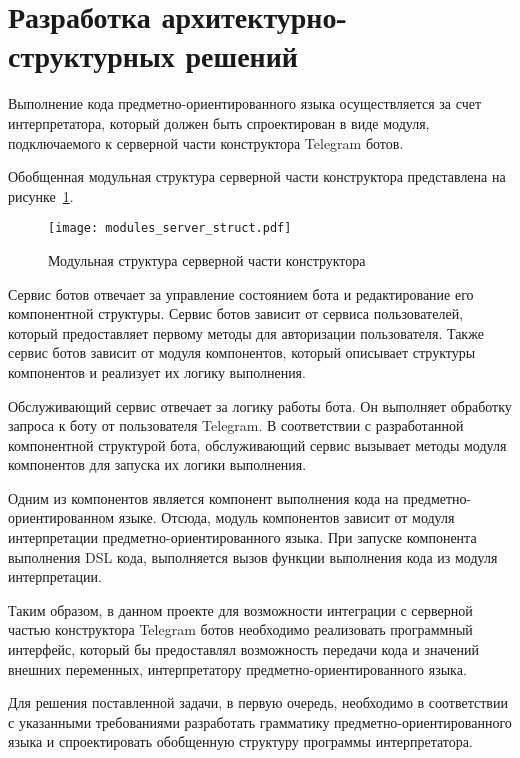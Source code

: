 \newpage

\section{Разработка архитектурно-структурных решений}

Выполнение кода предметно-ориентированного языка осуществляется за счет интерпретатора,
который должен быть спроектирован в виде модуля, подключаемого к серверной части конструктора Telegram ботов.

Обобщенная модульная структура серверной части конструктора представлена на рисунке~\ref{f:modules_server_struct}.

\begin{figure}[ht]
	\centering
	\vspace{\toppaddingoffigure}
	\texttt{[image: modules\_server\_struct.pdf]}
	\caption{Модульная структура серверной части конструктора}
	\label{f:modules_server_struct}
\end{figure}

Сервис ботов отвечает за управление состоянием бота и редактирование его компонентной структуры.
Сервис ботов зависит от сервиса пользователей, который предоставляет первому методы для авторизации пользователя.
Также сервис ботов зависит от модуля компонентов, который описывает структуры компонентов и реализует их логику выполнения.

Обслуживающий сервис отвечает за логику работы бота. 
Он выполняет обработку запроса к боту от пользователя Telegram.
В соответствии с разработанной компонентной структурой бота, обслуживающий сервис вызывает методы модуля компонентов для запуска их логики выполнения.

Одним из компонентов является компонент выполнения кода на предметно-ориентированном языке.
Отсюда, модуль компонентов зависит от модуля интерпретации предметно-ориентированного языка.
При запуске компонента выполнения DSL кода, выполняется вызов функции выполнения кода из модуля интерпретации.

Таким образом, в данном проекте для возможности интеграции с серверной частью конструктора Telegram ботов необходимо реализовать программный интерфейс,
который бы предоставлял возможность передачи кода и значений внешних переменных, интерпретатору предметно-ориентированного языка.

Для решения поставленной задачи, в первую очередь, необходимо в соответствии с указанными требованиями
разработать грамматику предметно-ориентированного языка и спроектировать обобщенную структуру программы интерпретатора.


